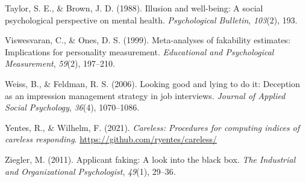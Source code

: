 \documentclass[
  ,man]{apa6}
\newlength{\cslhangindent}
\newlength{\cslentryspacingunit} %
\newenvironment{CSLReferences}[2] %
 {%
  \setlength{\parindent}{0pt}
  \ifodd #1
  \let\oldpar\par
  \def\par{\hangindent=\cslhangindent\oldpar}
  \fi
  \setlength{\parskip}{#2\cslentryspacingunit}
 }%
 {}
\begin{document}
\begin{CSLReferences}{1}{0}
\leavevmode{}%
Taylor, S. E., \& Brown, J. D. (1988). Illusion and well-being: A social psychological perspective on mental health. \emph{Psychological Bulletin}, \emph{103}(2), 193.

\leavevmode{}%
Viswesvaran, C., \& Ones, D. S. (1999). Meta-analyses of fakability estimates: Implications for personality measurement. \emph{Educational and Psychological Measurement}, \emph{59}(2), 197--210.

\leavevmode{}%
Weiss, B., \& Feldman, R. S. (2006). Looking good and lying to do it: Deception as an impression management strategy in job interviews. \emph{Journal of Applied Social Psychology}, \emph{36}(4), 1070--1086.

\leavevmode{}%
Yentes, R., \& Wilhelm, F. (2021). \emph{Careless: Procedures for computing indices of careless responding}. \url{https://github.com/ryentes/careless/}

\leavevmode{}%
Ziegler, M. (2011). Applicant faking: A look into the black box. \emph{The Industrial and Organizational Psychologist}, \emph{49}(1), 29--36.

\end{CSLReferences}

\endgroup
\end{document}
